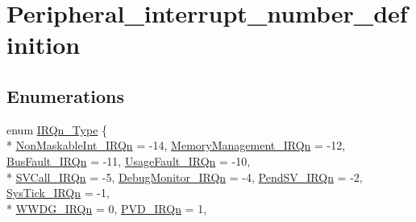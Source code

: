 \hypertarget{group___peripheral__interrupt__number__definition}{}\section{Peripheral\+\_\+interrupt\+\_\+number\+\_\+definition}
\label{group___peripheral__interrupt__number__definition}
\subsection*{Enumerations}
\begin{DoxyCompactItemize}
\item 
enum \hyperlink{group___peripheral__interrupt__number__definition_ga7e1129cd8a196f4284d41db3e82ad5c8}{I\+R\+Qn\+\_\+\+Type} \{ \\*
\hyperlink{group___peripheral__interrupt__number__definition_gga7e1129cd8a196f4284d41db3e82ad5c8ade177d9c70c89e084093024b932a4e30}{Non\+Maskable\+Int\+\_\+\+I\+R\+Qn} = -\/14, 
\hyperlink{group___peripheral__interrupt__number__definition_gga7e1129cd8a196f4284d41db3e82ad5c8a33ff1cf7098de65d61b6354fee6cd5aa}{Memory\+Management\+\_\+\+I\+R\+Qn} = -\/12, 
\hyperlink{group___peripheral__interrupt__number__definition_gga7e1129cd8a196f4284d41db3e82ad5c8a8693500eff174f16119e96234fee73af}{Bus\+Fault\+\_\+\+I\+R\+Qn} = -\/11, 
\hyperlink{group___peripheral__interrupt__number__definition_gga7e1129cd8a196f4284d41db3e82ad5c8a6895237c9443601ac832efa635dd8bbf}{Usage\+Fault\+\_\+\+I\+R\+Qn} = -\/10, 
\\*
\hyperlink{group___peripheral__interrupt__number__definition_gga7e1129cd8a196f4284d41db3e82ad5c8a4ce820b3cc6cf3a796b41aadc0cf1237}{S\+V\+Call\+\_\+\+I\+R\+Qn} = -\/5, 
\hyperlink{group___peripheral__interrupt__number__definition_gga7e1129cd8a196f4284d41db3e82ad5c8a8e033fcef7aed98a31c60a7de206722c}{Debug\+Monitor\+\_\+\+I\+R\+Qn} = -\/4, 
\hyperlink{group___peripheral__interrupt__number__definition_gga7e1129cd8a196f4284d41db3e82ad5c8a03c3cc89984928816d81793fc7bce4a2}{Pend\+S\+V\+\_\+\+I\+R\+Qn} = -\/2, 
\hyperlink{group___peripheral__interrupt__number__definition_gga7e1129cd8a196f4284d41db3e82ad5c8a6dbff8f8543325f3474cbae2446776e7}{Sys\+Tick\+\_\+\+I\+R\+Qn} = -\/1, 
\\*
\hyperlink{group___peripheral__interrupt__number__definition_gga7e1129cd8a196f4284d41db3e82ad5c8a971089d7566ef902dfa0c80ac3a8fd52}{W\+W\+D\+G\+\_\+\+I\+R\+Qn} = 0, 
\hyperlink{group___peripheral__interrupt__number__definition_gga7e1129cd8a196f4284d41db3e82ad5c8ab0b51ffcc4dcf5661141b79c8e5bd924}{P\+V\+D\+\_\+\+I\+R\+Qn} = 1, 

\end{DoxyCompactItemize}
